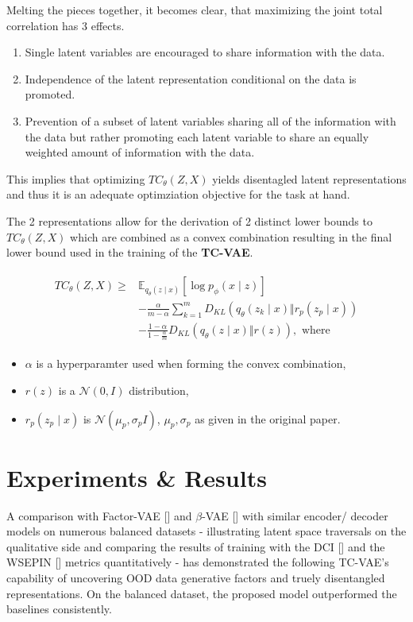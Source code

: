 \documentclass[twoside,11pt]{article}
\begin{document}
Melting the pieces together, it becomes clear, that maximizing the joint total correlation has 3 effects.
\begin{enumerate}
  \item Single latent variables are encouraged to share information with the data.
  \item Independence of the latent representation conditional on the data is promoted.
  \item Prevention of a subset of latent variables sharing all of the information with the data but rather promoting each latent variable to share an equally weighted amount of information with the data.
\end{enumerate}
This implies that optimizing $TC_{\theta}(Z,X)$ yields disentagled latent representations and thus it is an adequate optimziation objective for the task at hand.

The 2 representations allow for the derivation of 2 distinct lower bounds to $TC_{\theta}(Z, X)$ which are combined as a convex combination resulting in the final lower bound used in the training of the \textbf{TC-VAE}.

\begin{definition}
  \begin{align*}
    \begin{split}
      TC_{\theta}(Z, X) \geq & \mathbb{E}_{q_{\theta}(z \mid x)}[\log p_{\phi}(x \mid z)] \\
      & - \frac{\alpha}{m - \alpha} \sum_{k=1}^{m}D_{KL}(q_{\theta}(z_{k} \mid x) \Vert r_{p}(z_{p} \mid x)) \\
      & - \frac{1 - \alpha}{1 - \frac{\alpha}{m}} D_{KL}(q_{\theta}(z \mid x) \Vert r(z)), \text{ where }
    \end{split}
  \end{align*}
  \begin{itemize}
    \item $\alpha$ is a hyperparamter used when forming the convex combination,
    \item  $r(z)$ is a $\mathcal{N}(0, I)$ distribution,
    \item $r_{p}(z_{p} \mid x)$ is  $\mathcal{N}(\mu_{p}, \sigma_{p}I)$, $\mu_{p}, \sigma_{p}$ as given in the original paper.
  \end{itemize}
\end{definition}



\section{Experiments \& Results}
A comparison with Factor-VAE [\cite{FactorVAE}] and $\beta$-VAE [\cite{betaVAE}] with similar encoder/ decoder models on numerous balanced datasets - illustrating latent space traversals on the qualitative side and comparing the results of training with the DCI [\cite{DCI}] and the WSEPIN [\cite{WSEPIN}] metrics quantitatively - has demonstrated the following TC-VAE's capability of uncovering OOD data generative factors and truely disentangled representations. On the balanced dataset, the proposed model outperformed the baselines consistently.
\end{document}
